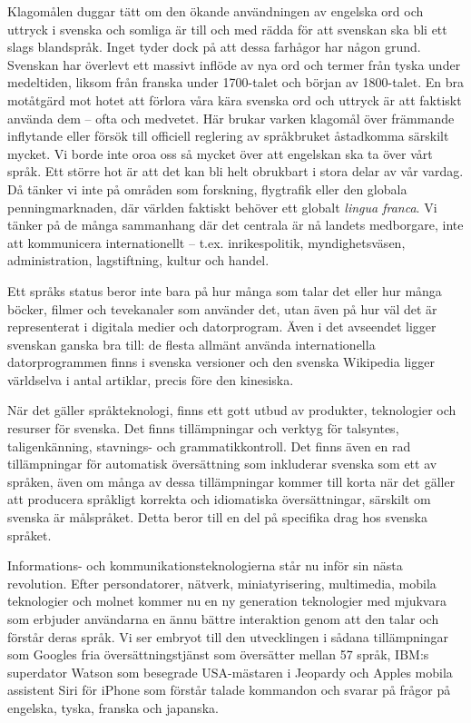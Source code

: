 \begin{multicols}{2}
Klagomålen duggar tätt om den ökande användningen av engelska ord och
uttryck i svenska och somliga är till och med rädda för att svenskan
ska bli ett slags blandspråk. Inget tyder dock på att \mbox{dessa} farhågor
har någon grund. Svenskan har överlevt ett massivt inflöde av nya ord
och termer från tyska \mbox{under} medel\-tiden, liksom från franska under
1700-talet och början av 1800-talet. En bra motåtgärd mot hotet att
förlora våra kära svenska ord och uttryck är att faktiskt använda dem
-- ofta och medvetet. Här brukar varken klagomål över främmande
in\-flyt\-ande eller försök till officiell reglering av språk\-bruket
åstadkomma särskilt mycket. Vi \mbox{borde} inte oroa oss så mycket över att
engelskan ska ta över vårt språk. Ett större hot är att det kan bli
helt obrukbart i \mbox{stora} delar av vår vardag. Då \mbox{tänker} vi inte på
områden som forskning, flygtrafik \mbox{eller} den globala penningmarknaden,
där världen fakt\-iskt be\-höver ett globalt \emph{lingua franca}. Vi tänker på
de många samman\-hang där det centrala är nå land\-ets med\-borg\-are, inte
att kommunicera inter\-nation\-ellt -- t.ex. inrikes\-politik,
myndighets\-väsen, admin\-istra\-tion, lag\-stiftning, \mbox{kultur} och handel.

Ett språks status beror inte bara på hur många som talar det eller hur
många böcker, filmer och tevekanaler som använder det, utan även på
hur väl det är representerat i digitala medier och dator\-program. Även
i det avseendet ligger svenskan \mbox{ganska} bra till: de flesta allmänt
använda internationella dator\-programmen finns i svenska versioner och
den svenska Wikipedia ligger världselva i antal artiklar, precis före
den kinesiska.

När det gäller språkteknologi, finns ett gott utbud av produkter,
teknologier och resurser för svenska. Det finns tillämpningar och
verktyg för talsyntes, tal\-igen\-känn\-ing, stavnings- och
grammatikkontroll. Det finns även en rad tillämpningar för automatisk
översättning som inkluderar svenska som ett av språken, även om många
av dessa tillämpningar kommer till korta när det gäller att producera
språkligt korrekta och idiomatiska översättningar, särskilt om \mbox{svenska}
är målspråket. Detta beror till en del på specifika drag hos svenska
språket.

Informations- och kommunikationsteknologierna står nu inför sin nästa
revolution. Efter person\-datorer, nätverk, miniatyrisering, multimedia,
\mbox{mobila} teknologier och molnet kommer nu en ny generation teknologier
med mjukvara som er\-bjud\-er användarna en ännu bättre interaktion genom
att den talar och förstår deras språk. Vi ser embryot till den
utvecklingen i sådana tillämpningar som \mbox{Googles} fria
översättningstjänst som översätter \mbox{mellan} 57 språk, IBM:s superdator
Watson som besegrade USA-mästaren i Jeopardy och Apples mobila
assist\-ent Siri för iPhone som förstår talade kommandon och svarar på
frågor på engelska, tyska, franska och japanska.


\end{multicols}
